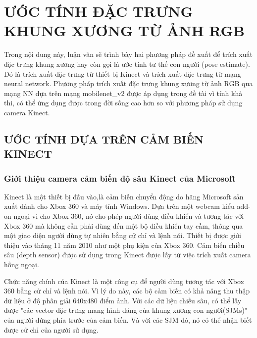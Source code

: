 \chapter{ƯỚC TÍNH ĐẶC TRƯNG KHUNG XƯƠNG TỪ ẢNH RGB}
\label{s:pose estimate}
Trong nội dung này, luận văn sẽ trình bày hai phương pháp đề xuất để trích xuất đặc trưng khung xương hay còn gọi là ước tính tư thế con người (pose estimate). Đó là trích xuất đặc trưng từ thiết bị Kinect và trích xuất đặc trưng từ mạng neural network. Phương pháp trích xuất đặc trưng khung xương từ ảnh RGB qua mạng NN dựa trên mạng mobilenet\_v2 được áp dụng trong đề tài vì tính khả thi, có thể ứng dụng được trong đời sống cao hơn so với phương pháp sử dụng camera Kinect.

\section{ƯỚC TÍNH DỰA TRÊN CẢM BIẾN KINECT}
\label{ss:kinect}
\subsection{Giới thiệu camera cảm biến độ sâu Kinect của Microsoft}
Kinect là một thiết bị đầu vào,là cảm biến chuyển động do hãng Microsoft sản xuất dành cho Xbox 360 và máy tính Windows. Dựa trên một webcam kiểu add-on ngoại vi cho Xbox 360, nó cho phép người dùng điều khiển và tương tác với Xbox 360 mà không cần phải dùng đến một bộ điều khiển tay cầm, thông qua một giao diện người dùng tự nhiên bằng cử chỉ và lệnh nói. Thiết bị được giới thiệu vào tháng 11 năm 2010 như một phụ kiện của Xbox 360. Cảm biến chiều sâu (depth sensor) được sử dụng trong Kinect được lấy từ việc trích xuất camera hồng ngoại. 

Chức năng chính của Kinect là một công cụ để người dùng tương tác với Xbox 360 bằng cử chỉ và lệnh nói. Vì lý do này, các bộ cảm biến có khả năng thu thập dữ liệu ở độ phân giải 640x480 điểm ảnh. Với các dữ liệu chiều sâu, có thể lấy được "các vector đặc trưng mang hình dáng của khung xương con người(SJMs)" của người đứng phía trước của cảm biến. Và với các SJM đó, nó có thể nhận biết được cử chỉ của người sử dụng.

